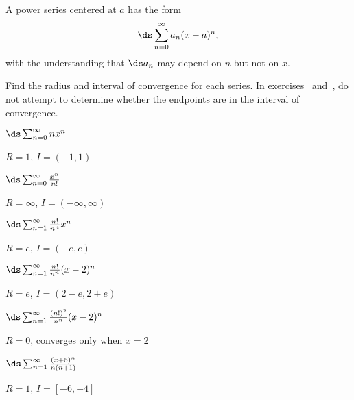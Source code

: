 \begin{definition} A power series centered at $a$ has the form
$$\ds\sum_{n=0}^\infty a_n(x-a)^n,$$ 
with the understanding that $\ds a_n$ may depend on $n$ but not on
$x$.
\end{definition}

\begin{exercises}

Find the radius and interval of convergence for each series.  In
exercises~ and~,
do not attempt to determine whether the endpoints are in the
interval of convergence.

\twocol

\exercise $\ds\sum_{n=0}^\infty n x^n$
\begin{answer} $R=1$, $I=(-1,1)$
\end{answer}

\exercise $\ds\sum_{n=0}^\infty {x^n\over n!}$
\begin{answer} $R=\infty$, $I=(-\infty,\infty)$
\end{answer}

\exercise 
\relax\label{exer:no endpoints one}
$\ds\sum_{n=1}^\infty {n!\over n^n}x^n$
\begin{answer} $R=e$, $I=(-e,e)$
\end{answer}

\exercise 
\relax\label{exer:no endpoints two}
$\ds\sum_{n=1}^\infty {n!\over n^n}(x-2)^n$
\begin{answer} $R=e$, $I=(2-e,2+e)$
\end{answer}

\exercise $\ds\sum_{n=1}^\infty {(n!)^2\over n^n}(x-2)^n$
\begin{answer} $R=0$, converges only when $x=2$
\end{answer}

\exercise $\ds\sum_{n=1}^\infty {(x+5)^n\over n(n+1)}$
\begin{answer} $R=1$, $I=[-6,-4]$
\end{answer}

\endtwocol

\end{exercises}

